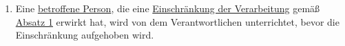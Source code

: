 \begin{enumerate}
  \item Eine \hyperref[itm:04-1]{betroffene Person}, die eine \hyperref[itm:04-3]{Einschränkung der Verarbeitung} gemäß \hyperref[itm:18-1]{Absatz 1} erwirkt hat,
   wird von dem Verantwortlichen unterrichtet, bevor die Einschränkung aufgehoben wird.
  \label{itm:18-3}

\end{enumerate}


